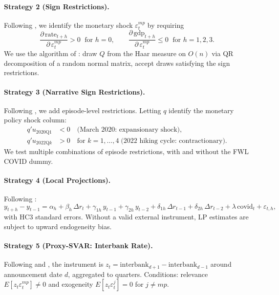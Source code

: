 \documentclass[12pt,letterpaper]{article}
\begin{document}
\paragraph{Strategy 2 (Sign Restrictions).}
Following \citet{uhlig2005}, we identify the monetary shock $\varepsilon^{mp}_t$
by requiring
\begin{equation}
  \frac{\partial\,\mathrm{rate}_{t+h}}{\partial\,\varepsilon^{mp}_t}>0
  \;\text{ for }h=0,\qquad
  \frac{\partial\,\mathrm{gdp}_{t+h}}{\partial\,\varepsilon^{mp}_t}\leq0
  \;\text{ for }h=1,2,3.
\end{equation}
We use the algorithm of \citet{rubioramirez2010}: draw $Q$ from the Haar
measure on $O(n)$ via QR decomposition of a random normal matrix, accept
draws satisfying the sign restrictions.

\paragraph{Strategy 3 (Narrative Sign Restrictions).}
Following \citet{antolin2018}, we add episode-level restrictions. Letting
$q$ identify the monetary policy shock column:
\begin{align}
  q'u_{2020\mathrm{Q1}} &< 0 \quad\text{(March 2020: expansionary shock)},\\
  q'u_{2022\mathrm{Q}k} &> 0 \quad\text{for }k=1,\ldots,4
  \;\text{(2022 hiking cycle: contractionary)}.
\end{align}
We test multiple combinations of episode restrictions, with and without
the FWL COVID dummy.

\paragraph{Strategy 4 (Local Projections).}
Following \citet{jorda2005}:
\begin{equation}
  y_{t+h}-y_{t-1} = \alpha_h + \beta_h\,\Delta r_t
    + \gamma_{1h}\,y_{t-1} + \gamma_{2h}\,y_{t-2}
    + \delta_{1h}\,\Delta r_{t-1} + \delta_{2h}\,\Delta r_{t-2}
    + \lambda\,\mathrm{covid}_t + \varepsilon_{t,h},
  \label{eq:lp}
\end{equation}
with HC3 standard errors. Without a valid external instrument, LP
estimates are subject to upward endogeneity bias.

\paragraph{Strategy 5 (Proxy-SVAR: Interbank Rate).}
Following \citet{stock2018} and \citet{gertler2015}, the instrument is
$z_t = \mathrm{interbank}_{d+1} - \mathrm{interbank}_{d-1}$ around
announcement date $d$, aggregated to quarters. Conditions: relevance
$E[z_t\varepsilon^{mp}_t]\neq0$ and exogeneity $E[z_t\varepsilon^j_t]=0$
for $j\neq mp$.
\end{document}
